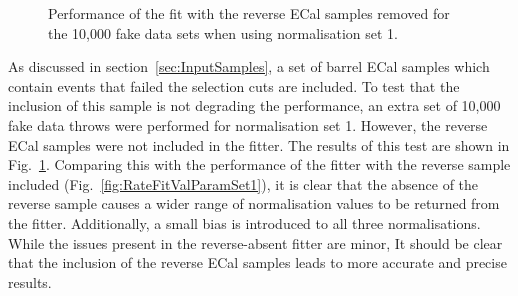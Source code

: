 \begin{figure}%
  \centering
  \caption{Performance of the fit with the reverse ECal samples removed for the 10,000 fake data sets when using normalisation set 1.}
  \label{fig:RateFitValParamSet1NoReverse}
\end{figure}
\newline
\newline
As discussed in section~\ref{sec:InputSamples}, a set of barrel ECal samples which contain events that failed the selection cuts are included.  To test that the inclusion of this sample is not degrading the performance, an extra set of 10,000 fake data throws were performed for normalisation set 1.  However, the reverse ECal samples were not included in the fitter.  The results of this test are shown in Fig.~\ref{fig:RateFitValParamSet1NoReverse}.  Comparing this with the performance of the fitter with the reverse sample included (Fig.~\ref{fig:RateFitValParamSet1}), it is clear that the absence of the reverse sample causes a wider range of normalisation values to be returned from the fitter.  Additionally, a small bias is introduced to all three normalisations.  While the issues present in the reverse-absent fitter are minor, It should be clear that the inclusion of the reverse ECal samples leads to more accurate and precise results.

